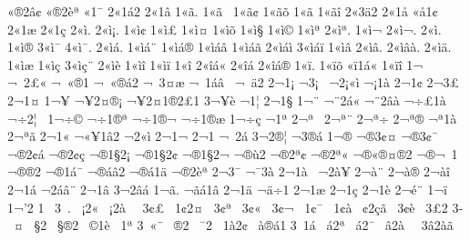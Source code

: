 {^^ab^^ae2^^e2^^a2
^^ab^^ae2^^e8^^aa
^^ab1^^af
2^^ab1^^e12
2^^ab1^^e2
1^^ab^^e3.
1^^ab^^e3^^a0
1^^ab^^e3^^a2
1^^ab^^e3^^f5
1^^ab^^e3^^ad
1^^ab^^e3^^ee
2^^ab3^^e42
2^^ab1^^e5
^^ab^^e51^^a2
2^^ab1^^e6
2^^ab1^^e7
2^^ab^^ec.
2^^ab^^ec^^a1.
1^^ab^^ec^^a2
1^^ab^^ec^^a3
1^^ab^^ec^^a4
1^^ab^^ec^^f5
1^^ab^^ec^^a7
1^^ab^^ec^^a9
1^^ab^^ec^^aa
2^^ab^^ec^^aa.
1^^ab^^ec^^ac
2^^ab^^ec^^ac.
2^^ab^^ec^^ad.
1^^ab^^ec^^ae
3^^ab^^ec^^af
4^^ab^^ec^^af.
2^^ab^^ec^^e1.
1^^ab^^ec^^e1^^a8
1^^ab^^ec^^e1^^ae
1^^ab^^ec^^e1^^e2
1^^ab^^ec^^e1^^e3
2^^ab^^ec^^e1^^ec
3^^ab^^ec^^e1^^ef
1^^ab^^ec^^e2
2^^ab^^ec^^e2.
2^^ab^^ec^^e2^^e0.
2^^ab^^ec^^e4.
1^^ab^^ec^^e6
1^^ab^^ec^^e7
3^^ab^^ec^^e7^^a8
2^^ab^^ec^^e8
1^^ab^^ec^^ee
1^^ab^^ec^^ef
1^^ab^^ee
2^^ab^^ee^^e1^^ab
2^^ab^^ee^^e1^^ad
2^^ab^^ee^^e1^^ae
1^^ab^^ef.
1^^ab^^ef^^f5
^^ab^^ef1^^e1^^ab
1^^ab^^ef^^ee
1^^ac^^a0
^^ac^^a02^^a3^^ab
^^ac^^a0^^ab^^ae1
^^ac^^a0^^ab^^ae^^e12
^^ac^^a0^^ad3^^a4^^e6
^^ac^^a01^^e1^^e2^^a0
^^ac^^a0^^e42
2^^ac1^^a1
^^ac3^^a1^^a0
^^ac2^^a1^^ab^^ec
^^ac^^a11^^e0
2^^ac1^^a2
2^^ac3^^a3
2^^ac1^^a4
1^^ac^^a5
^^ac^^a52^^a4^^ae^^a1
^^ac^^a52^^a41^^ae2^^a31
3^^ac^^a5^^ad^^e8
^^ac1^^a6
2^^ac1^^a7
1^^ac^^a8
^^ac^^a82^^e1^^ab
^^ac^^a82^^e2^^e0
^^ac^^f7^^a31^^e0
^^ac^^f72^^a6^^a0
1^^ac^^f7^^a9
^^ac^^f71^^ae^^aa
^^ac^^f71^^ae^^ac
^^ac^^f71^^ae^^e6
1^^ac^^f7^^e7
^^ac1^^aa
2^^ac^^aa^^a0
2^^ac^^aa^^a8
2^^ac^^aa^^f7
2^^ac^^aa^^ae
^^ac^^aa1^^e0
2^^ac^^aa^^e3
2^^ac1^^ab
^^ac^^ab^^a51^^e22
^^ac2^^ab^^ec
2^^ac1^^ac
2^^ac1^^ad
^^ac^^ad^^a02^^e1
3^^ac2^^ad^^ae^^a6
^^ac3^^ad^^ae^^e1
1^^ac^^ae
^^ac^^ae3^^a2^^a4
^^ac^^ae3^^a2^^af
^^ac^^ae2^^a2^^e1
^^ac^^ae2^^a2^^e7
^^ac^^ae1^^a72^^a1
^^ac^^ae1^^a72^^a2
^^ac^^ae1^^a72^^ac
^^ac^^ae^^f92
^^ac^^ae2^^aa^^a2
^^ac^^ae2^^aa^^ab
^^ac^^ae^^ab^^ae^^a4^^ae2
^^ac^^ae^^ac^^a01
^^ac^^ae^^ae2
^^ac^^ae1^^e1^^af
^^ac^^ae^^e1^^e22
^^ac^^ae^^e11^^e4
^^ac^^ae2^^e8^^aa
2^^ac3^^af
^^ac^^af3^^e0
2^^ac1^^e0^^a0
^^ac2^^e0^^a5
2^^ac^^e0^^a8
2^^ac^^e0^^ae
2^^ac^^e0^^ee
2^^ac1^^e1
^^ac2^^e1^^e2^^a8
2^^ac1^^e2
3^^ac2^^e2^^e1
1^^ac^^e3.
^^ac^^e3^^e11^^e2
2^^ac1^^e4
^^ac^^e4^^f71
2^^ac1^^e6
2^^ac1^^e7
2^^ac1^^e8
2^^ac^^e9^^a8
1^^ac^^ef
1^^ac'2
1^^ad^^a0
3^^ad^^a0.
^^ad^^a0^^a12^^ab
^^ad^^a0^^a12^^e0^^a0
^^ad^^a03^^a2^^a3
^^ad^^a01^^a22^^a4
^^ad^^a03^^a2^^aa
^^ad^^a03^^a2^^ab
^^ad^^a03^^a2^^ac
^^ad^^a01^^a2^^af
^^ad^^a01^^a2^^e0
^^ad^^a0^^a22^^e7^^e3
^^ad^^a03^^a2^^e8
^^ad^^a03^^a32
3^^ad^^a0^^a4
^^ad^^a0^^a72
^^ad^^a0^^a7^^ae2
^^ad^^a0^^a91^^e8
^^ad^^a01^^aa
3^^ad^^a0^^ab^^a8
^^ad^^a0^^ae2
^^ad^^a0^^af2
^^ad^^a01^^e02^^a2
^^ad^^a0^^e0^^ae^^e11
3^^ad^^a01^^e1
^^ad^^a0^^e12^^aa
^^ad^^a0^^e12^^af
^^ad^^a0^^e22^^e0^^a0
^^ad^^a03^^e22^^e0^^e3
}
